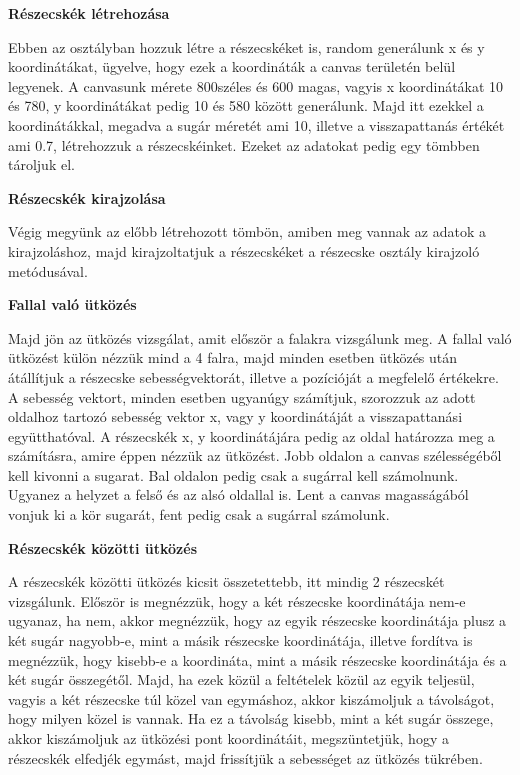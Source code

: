 \textbf{Részecskék létrehozása}

Ebben az osztályban hozzuk létre a részecskéket is, random generálunk x és y koordinátákat, ügyelve, hogy ezek a koordináták a canvas területén belül legyenek. A canvasunk mérete 800széles és 600 magas, vagyis x koordinátákat 10 és 780, y koordinátákat pedig 10 és 580 között generálunk. Majd itt ezekkel a koordinátákkal, megadva a sugár méretét ami 10, illetve a visszapattanás értékét ami 0.7, létrehozzuk a részecskéinket. Ezeket az adatokat pedig egy tömbben tároljuk el. 

\textbf{Részecskék kirajzolása}


Végig megyünk az előbb létrehozott tömbön, amiben meg vannak az adatok a kirajzoláshoz, majd kirajzoltatjuk a részecskéket a részecske osztály kirajzoló metódusával. 


\textbf{Fallal való ütközés}

Majd jön az ütközés vizsgálat, amit először a falakra vizsgálunk meg. A fallal való ütközést külön nézzük mind a 4 falra, majd minden esetben ütközés után átállítjuk a részecske sebességvektorát, illetve a pozícióját a megfelelő értékekre. A sebesség vektort, minden esetben ugyanúgy számítjuk, szorozzuk az adott oldalhoz tartozó sebesség vektor x, vagy y koordinátáját a visszapattanási együtthatóval. A részecskék x, y koordinátájára pedig az oldal határozza meg a számításra, amire éppen nézzük az ütközést. Jobb oldalon a canvas szélességéből kell kivonni a sugarat. Bal oldalon pedig csak a sugárral kell számolnunk. Ugyanez a helyzet a felső és az alsó oldallal is. Lent a canvas magasságából vonjuk ki a kör sugarát, fent pedig csak a sugárral számolunk.

\textbf{Részecskék közötti ütközés}

A részecskék  közötti ütközés kicsit összetettebb, itt mindig 2 részecskét vizsgálunk. Először is megnézzük, hogy a két részecske koordinátája nem-e ugyanaz, ha nem, akkor megnézzük, hogy az egyik részecske koordinátája plusz a két sugár nagyobb-e, mint a másik részecske koordinátája, illetve fordítva is megnézzük, hogy kisebb-e a koordináta, mint a másik részecske koordinátája és a két sugár összegétől. Majd, ha ezek közül a feltételek közül az egyik teljesül, vagyis a két részecske túl közel van egymáshoz, akkor kiszámoljuk a távolságot, hogy milyen közel is vannak. Ha ez a távolság kisebb, mint a két sugár összege, akkor kiszámoljuk az ütközési pont koordinátáit, megszüntetjük, hogy a részecskék elfedjék egymást, majd frissítjük a sebességet az ütközés tükrében.

